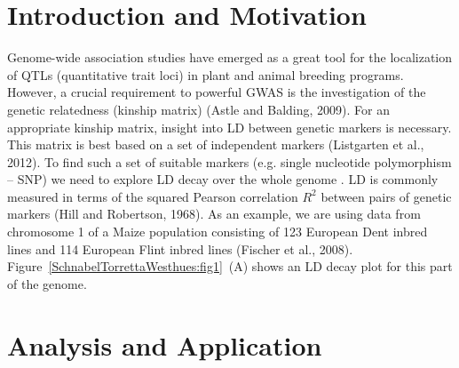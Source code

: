 \documentclass[twoside]{report}
\begin{document}
\section{Introduction and Motivation}
Genome-wide association studies have emerged as a great tool for the 
localization of QTLs (quantitative trait loci) in plant and animal breeding programs.
However, a crucial requirement to powerful GWAS is the investigation of the genetic 
relatedness (kinship matrix) (Astle and Balding, 2009). 
For an appropriate kinship matrix, insight into LD between 
genetic markers is necessary. This matrix is best based on a set of independent markers 
(Listgarten et al., 2012).
To find such a set of suitable markers (e.g. single nucleotide polymorphism -- SNP) we need 
to explore LD decay over the whole genome . LD is commonly measured in terms of 
the squared Pearson correlation $R^2$ between pairs of genetic
markers (Hill and Robertson, 1968). As an example, we are using data from chromosome 1 of a Maize 
population consisting of 123 European Dent inbred lines and 114 European Flint inbred lines
(Fischer et al., 2008). Figure~\ref{SchnabelTorrettaWesthues:fig1}~(A) shows an LD decay plot 
for this part of the genome. 

\section{Analysis and Application}
\end{document}
